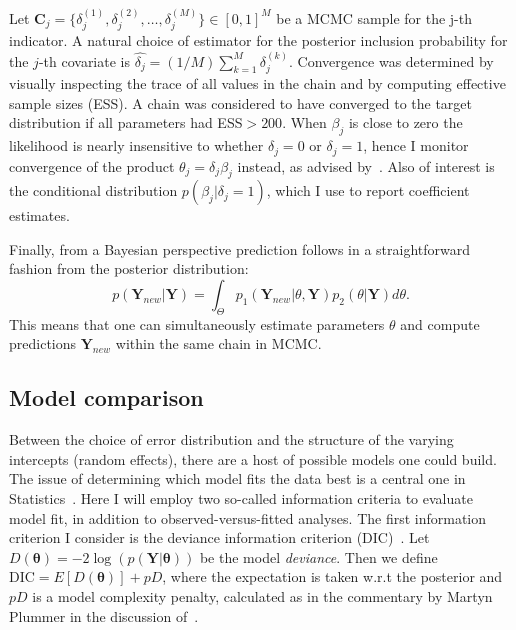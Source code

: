Let $\mathbf{C}_j = \{ \delta_j^{(1)}, \delta_j^{(2)}, \ldots, \delta_j^{(M)} \} \in [0, 1]^M$ be a MCMC sample for the j-th indicator.
A natural choice of estimator for the posterior inclusion probability for the $j$-th covariate is $\hat{\delta_j} = (1/M)\sum_{k=1}^M \delta_j^{(k)}$.
Convergence was determined by visually inspecting the trace of all values in the chain and by computing effective sample sizes (ESS).
A chain was considered to have converged to the target distribution if all parameters had ESS$>200$.
When $\beta_j$ is close to zero the likelihood is nearly insensitive to whether $\delta_j = 0$ or $\delta_j = 1$, hence I monitor convergence of the product $\theta_j = \delta_j\beta_j$ instead, as advised by~\cite{OHara2009}.
Also of interest is the conditional distribution $p(\beta_j | \delta_j = 1)$, which I use to report coefficient estimates. 

Finally, from a Bayesian perspective prediction follows in a straightforward fashion from the posterior distribution:
\[ p(\boldsymbol Y_{new}  | \boldsymbol Y) = \int_{\Theta} p_1(\boldsymbol Y_{new} | \theta, \boldsymbol Y) p_2(\theta | \boldsymbol Y) d\theta.   \]
This means that one can simultaneously estimate parameters $\theta$  and compute predictions $\boldsymbol Y_{new}$ within the same chain in MCMC.

\subsection{Model comparison}
\label{sec:modcomp}

Between the choice of error distribution and the structure of the varying intercepts (random effects), there are a host of possible models one could build.
The issue of determining which model fits the data best is a central one in Statistics~\citep{Kass1995,Vehtari2017}.
Here I will employ two so-called information criteria to evaluate model fit, in addition to observed-versus-fitted analyses.
The first information criterion I consider is the deviance information criterion (DIC)~\citep{Spiegelhalter2002}.
Let $D(\boldsymbol\theta) = -2 \log(p(\boldsymbol Y | \boldsymbol\theta))$ be the model \textit{deviance}.
Then we define $\text{DIC} = E[D(\boldsymbol\theta)] + pD$, where the expectation is taken w.r.t the posterior and $pD$ is a model complexity penalty, calculated as in the commentary by Martyn Plummer in the discussion of~\cite{Spiegelhalter2002}.


